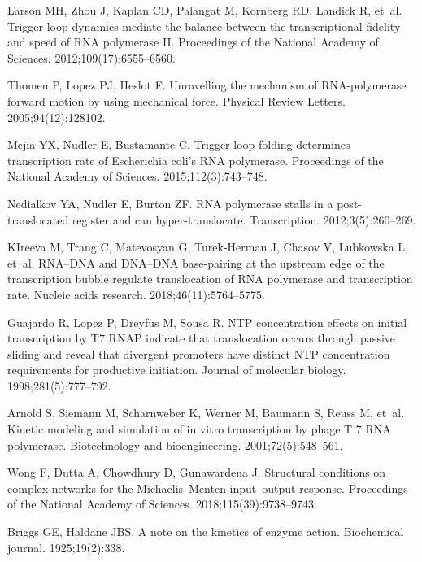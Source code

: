 \documentclass[10pt,letterpaper]{article}
\begin{document}
{{\begin{thebibliography}{10}
Larson MH, Zhou J, Kaplan CD, Palangat M, Kornberg RD, Landick R, et~al.
\newblock Trigger loop dynamics mediate the balance between the transcriptional
  fidelity and speed of RNA polymerase II.
\newblock Proceedings of the National Academy of Sciences.
  2012;109(17):6555--6560.

Thomen P, Lopez PJ, Heslot F.
\newblock Unravelling the mechanism of RNA-polymerase forward motion by using
  mechanical force.
\newblock Physical Review Letters. 2005;94(12):128102.

Mejia YX, Nudler E, Bustamante C.
\newblock Trigger loop folding determines transcription rate of Escherichia
  coli's RNA polymerase.
\newblock Proceedings of the National Academy of Sciences.
  2015;112(3):743--748.

Nedialkov YA, Nudler E, Burton ZF.
\newblock RNA polymerase stalls in a post-translocated register and can
  hyper-translocate.
\newblock Transcription. 2012;3(5):260--269.

KIreeva M, Trang C, Matevosyan G, Turek-Herman J, Chasov V, Lubkowska L, et~al.
\newblock RNA--DNA and DNA--DNA base-pairing at the upstream edge of the
  transcription bubble regulate translocation of RNA polymerase and
  transcription rate.
\newblock Nucleic acids research. 2018;46(11):5764--5775.

Guajardo R, Lopez P, Dreyfus M, Sousa R.
\newblock NTP concentration effects on initial transcription by T7 RNAP
  indicate that translocation occurs through passive sliding and reveal that
  divergent promoters have distinct NTP concentration requirements for
  productive initiation.
\newblock Journal of molecular biology. 1998;281(5):777--792.

Arnold S, Siemann M, Scharnweber K, Werner M, Baumann S, Reuss M, et~al.
\newblock Kinetic modeling and simulation of in vitro transcription by phage T
  7 RNA polymerase.
\newblock Biotechnology and bioengineering. 2001;72(5):548--561.

Wong F, Dutta A, Chowdhury D, Gunawardena J.
\newblock Structural conditions on complex networks for the Michaelis--Menten
  input--output response.
\newblock Proceedings of the National Academy of Sciences.
  2018;115(39):9738--9743.

Briggs GE, Haldane JBS.
\newblock A note on the kinetics of enzyme action.
\newblock Biochemical journal. 1925;19(2):338.


\end{thebibliography}}}
\end{document}
